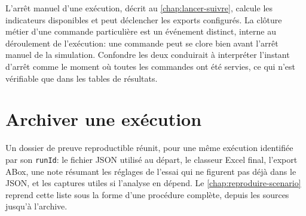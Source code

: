 L'arrêt manuel d'une exécution, décrit au \cref{chap:lancer-suivre}, calcule les indicateurs disponibles et peut déclencher les exports configurés. La clôture métier d'une commande particulière est un événement distinct, interne au déroulement de l'exécution: une commande peut se clore bien avant l'arrêt manuel de la simulation. Confondre les deux conduirait à interpréter l'instant d'arrêt comme le moment où toutes les commandes ont été servies, ce qui n'est vérifiable que dans les tables de résultats.

\section{Archiver une exécution}

Un dossier de preuve reproductible réunit, pour une même exécution identifiée par son \texttt{runId}: le fichier JSON utilisé au départ, le classeur Excel final, l'export ABox, une note résumant les réglages de l'essai qui ne figurent pas déjà dans le JSON, et les captures utiles si l'analyse en dépend. Le \cref{chap:reproduire-scenario} reprend cette liste sous la forme d'une procédure complète, depuis les sources jusqu'à l'archive.


